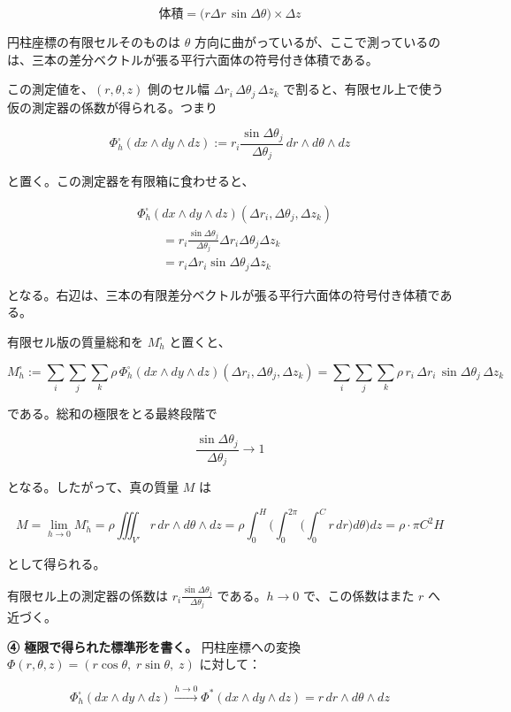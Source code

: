 \documentclass[a4paper,12pt,openany]{book}
\begin{document}
\[\text{体積} = \bigl(r\Delta r\,\sin\Delta\theta\bigr) \times \Delta z\]

円柱座標の有限セルそのものは \(\theta\)
方向に曲がっているが、ここで測っているのは、三本の差分ベクトルが張る平行六面体の符号付き体積である。

この測定値を、\((r,\theta,z)\) 側のセル幅
\(\Delta r_i\,\Delta\theta_j\,\Delta z_k\)
で割ると、有限セル上で使う仮の測定器の係数が得られる。つまり

\[
\Phi_h^\square(dx\wedge dy\wedge dz)
:=
r_i\frac{\sin\Delta\theta_j}{\Delta\theta_j}\,dr\wedge d\theta\wedge dz
\]

と置く。この測定器を有限箱に食わせると、

\[
\begin{aligned}
&\Phi_h^\square(dx\wedge dy\wedge dz)
(\Delta r_i,\Delta\theta_j,\Delta z_k)\\
&\qquad =
r_i\frac{\sin\Delta\theta_j}{\Delta\theta_j}
\Delta r_i\Delta\theta_j\Delta z_k \\
&\qquad =
r_i\Delta r_i\sin\Delta\theta_j\Delta z_k
\end{aligned}
\]

となる。右辺は、三本の有限差分ベクトルが張る平行六面体の符号付き体積である。

有限セル版の質量総和を \(M_h^\square\) と置くと、

\[
M_h^\square
:=
\sum_i\sum_j\sum_k
\rho\,
\Phi_h^\square(dx\wedge dy\wedge dz)(\Delta r_i,\Delta\theta_j,\Delta z_k)
=
\sum_i\sum_j\sum_k
\rho\,r_i\,\Delta r_i\,\sin\Delta\theta_j\,\Delta z_k
\]

である。総和の極限をとる最終段階で

\[
\frac{\sin\Delta\theta_j}{\Delta\theta_j}\to 1
\]

となる。したがって、真の質量 \(M\) は

\[
M
=
\lim_{h\to0} M_h^\square
=
\rho\iiint_{V'} r\,dr\wedge d\theta\wedge dz
=
\rho
\int_0^H
\biggl(
  \int_0^{2\pi}
  \biggl(
    \int_0^C r\,dr
  \biggr)
  d\theta
\biggr)
dz
=
\rho\cdot\pi C^2H
\]

として得られる。

有限セル上の測定器の係数は
\(r_i\frac{\sin\Delta\theta_j}{\Delta\theta_j}\) である。\(h\to0\)
で、この係数はまた \(r\) へ近づく。

\textbf{④ 極限で得られた標準形を書く。} 円柱座標への変換
\(\Phi(r,\theta,z) = (r\cos\theta,\; r\sin\theta,\; z)\) に対して：

\[
\Phi_h^\square(dx\wedge dy\wedge dz)
\xrightarrow{h\to0}
\Phi^*(dx \wedge dy \wedge dz)
=
r\,dr \wedge d\theta \wedge dz
\]
\end{document}
